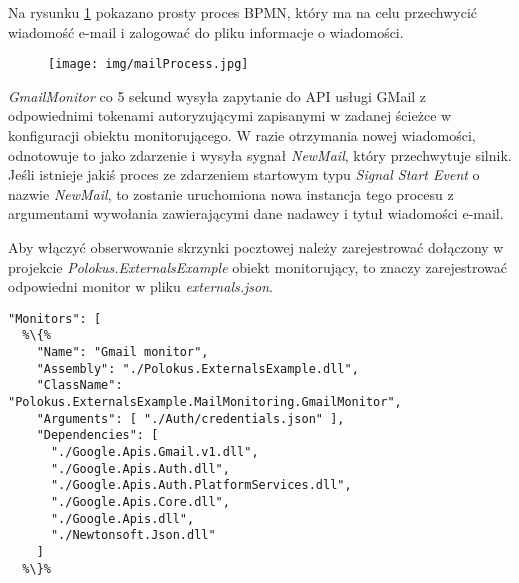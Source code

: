 \documentclass[declaration,shortabstract,mgr]{iithesis}
\newcommand{\bpmnnospace}{BPMN}
\begin{document}
Na rysunku \ref{fig:mailProcess} pokazano prosty proces \bpmnnospace, który ma na celu przechwycić wiadomość e-mail i zalogować do pliku informacje o wiadomości.

\begin{figure}[H]
    \texttt{[image: img/mailProcess.jpg]}
    \caption{}
    \label{fig:mailProcess}
\end{figure}

\textit{GmailMonitor} co 5 sekund wysyła zapytanie do API usługi GMail z odpowiednimi tokenami autoryzującymi zapisanymi w zadanej ścieżce w konfiguracji obiektu monitorującego. W razie otrzymania nowej wiadomości, odnotowuje to jako zdarzenie i wysyła sygnał \textit{NewMail}, który przechwytuje silnik. Jeśli istnieje jakiś proces ze zdarzeniem startowym typu \textit{Signal Start Event} o nazwie \textit{NewMail}, to zostanie uruchomiona nowa instancja tego procesu z argumentami wywołania zawierającymi dane nadawcy i tytuł wiadomości e-mail.

\newpage
 Aby włączyć obserwowanie skrzynki pocztowej należy zarejestrować dołączony w projekcie \textit{Polokus.ExternalsExample} obiekt monitorujący, to znaczy zarejestrować odpowiedni monitor w pliku \textit{externals.json}.

\begin{minipage}[c]{\textwidth}
\centering
\begin{lstlisting}
"Monitors": [
  %\{%
    "Name": "Gmail monitor",
    "Assembly": "./Polokus.ExternalsExample.dll",
    "ClassName": "Polokus.ExternalsExample.MailMonitoring.GmailMonitor",
    "Arguments": [ "./Auth/credentials.json" ],
    "Dependencies": [
      "./Google.Apis.Gmail.v1.dll",
      "./Google.Apis.Auth.dll",
      "./Google.Apis.Auth.PlatformServices.dll",
      "./Google.Apis.Core.dll",
      "./Google.Apis.dll",
      "./Newtonsoft.Json.dll"
    ]
  %\}%			
  
\end{lstlisting}
\end{minipage}








\newpage
\end{document}
